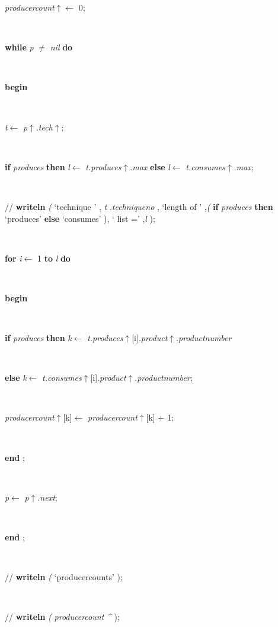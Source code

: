 \begin{tabbing}
\parbox{14cm}{\textsf{\textit{producercount}$\uparrow$\textit{}$\leftarrow$ 0}; }\\
\+\parbox{14cm}{\textsf {\textbf {while } \textsf{\textit{p} $\neq$ \textit{nil}} \textbf{ do } }}\\
\<\parbox{14cm}{\textsf{\textbf{begin} }}\\
\parbox{14cm}{\textsf{\textit{t}$\leftarrow$ \textit{p}$\uparrow$.\textit{tech}$\uparrow$\textit{}}; }\\
\parbox{14cm}{\textsf {\textbf {if } \textsf{\textit{produces}} \textbf{ then } \textsf{\textit{l}$\leftarrow$ \textit{t.produces}$\uparrow$.\textit{max}} \textbf{ else } \textsf{\textit{l}$\leftarrow$ \textit{t.consumes}$\uparrow$.\textit{max}}; }}\\
\parbox{14cm}{\textsf{//  \textbf{writeln} \textit{(} \textrm{\textup { `technique ' } }, \textit{t} .\textit{techniqueno} ,\textrm{\textup { `length of ' } },\textit{(} \textbf{if}  \textit{produces}  \textbf{then}  \textrm{\textup { `produces' } } \textbf{else}  \textrm{\textup { `consumes' } }),\textrm{\textup { ` list =' } },\textit{l} );}}\\
\+\parbox{14cm}{\textsf {\textbf {for } \textsf{\textit{i}$\leftarrow$ 1} \textbf{ to } \textsf{\textit{l}} \textbf{ do } }}\\
\<\parbox{14cm}{\textsf{\textbf{begin} }}\\
\+\parbox{14cm}{\textsf {\textbf {if } \textsf{\textit{produces}} \textbf{ then } \textsf{\textit{k}$\leftarrow$ \textit{t.produces}$\uparrow$\textit{}[i].\textit{product}$\uparrow$.\textit{productnumber}}}}\\
\-\<\parbox{14cm}{\textsf {\textbf {else } \textsf{\textit{k}$\leftarrow$ \textit{t.consumes}$\uparrow$\textit{}[i].\textit{product}$\uparrow$.\textit{productnumber}}; }}\\
\parbox{14cm}{\textsf{\textit{producercount}$\uparrow$\textit{}[k]$\leftarrow$ \textit{producercount}$\uparrow$\textit{}[k] + 1}; }\\
\<\-\parbox{14cm}{\textsf{\textbf{end} ;}}\\
\parbox{14cm}{\textsf{\textit{p}$\leftarrow$ \textit{p}$\uparrow$.\textit{next}}; }\\
\<\-\parbox{14cm}{\textsf{\textbf{end} ;}}\\
\parbox{14cm}{\textsf{//         \textbf{writeln} \textit{(} \textrm{\textup { `producercounts' } });}}\\
\parbox{14cm}{\textsf{//         \textbf{writeln} \textit{(} \textit{producercount} \textit{\^{}} );}}\\

\end{tabbing}
